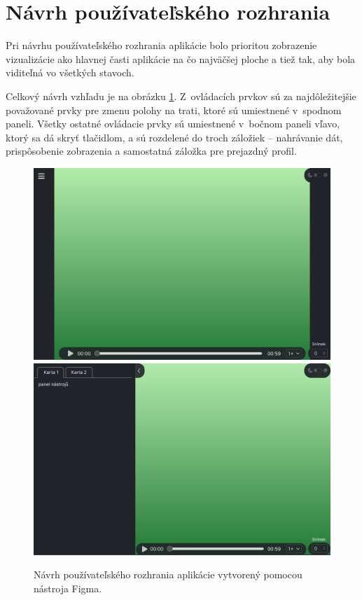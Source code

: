 \section{Návrh používateľského rozhrania}

Pri návrhu používateľského rozhrania aplikácie bolo prioritou zobrazenie vizualizácie ako hlavnej časti aplikácie na čo najväčšej ploche a tiež tak, aby bola viditeľná vo všetkých stavoch.

Celkový návrh vzhľadu je na obrázku \ref{fig:navrh_gui}. Z~ovládacích prvkov sú za najdôležitejšie považované prvky pre zmenu polohy na trati, ktoré sú umiestnené v~spodnom paneli. Všetky ostatné ovládacie prvky sú umiestnené v~bočnom paneli vľavo, ktorý sa dá skryť tlačidlom, a sú rozdelené do troch záložiek -- nahrávanie dát, prispôsobenie zobrazenia a samostatná záložka pre prejazdný profil. 

\begin{figure}[h]
    \centering
    \includegraphics[width=0.9\linewidth]{text_prace/obrazky-figures/navrh1.pdf}
    \includegraphics[width=0.9\linewidth]{text_prace/obrazky-figures/navrh2.pdf}
    \caption[Návrh používateľského rozhrania aplikácie.]{Návrh používateľského rozhrania aplikácie vytvorený pomocou nástroja Figma.}
    \label{fig:navrh_gui}
\end{figure}

